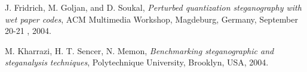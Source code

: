 \begin{thebibliography}{99}
\begin{flushright}\end{flushright}

 J. Fridrich, M. Goljan, and D. Soukal, {\it Perturbed quantization steganography with wet paper codes}, ACM Multimedia Workshop, Magdeburg, Germany, September 20-21 , 2004.

 M. Kharrazi, H. T. Sencer, N. Memon, {\it Benchmarking steganographic and steganalysis techniques}, Polytechnique University, Brooklyn, USA, 2004.

\end{thebibliography}




